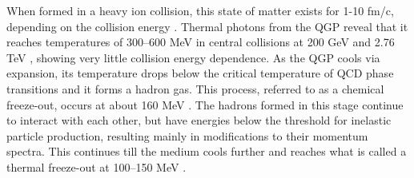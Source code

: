 When formed in a heavy ion collision, this state of matter exists for 1-10 fm/c, depending on the collision energy \cite{doi:10.1146/annurev.nucl.46.1.71}.
Thermal photons from the QGP reveal that it reaches temperatures of 300--600 MeV in central collisions at 200 GeV \cite{PhysRevLett.104.132301} and 2.76 TeV \cite{2016235}, showing very little collision energy dependence.
As the QGP cools via expansion, its temperature drops below the critical temperature of QCD phase transitions and it forms a hadron gas.
This process, referred to as a chemical freeze-out, occurs at about 160 MeV \cite{Fodor_2004, ADAMS2005102, PhysRevC.93.024917}.
The hadrons formed in this stage continue to interact with each other, but have energies below the threshold for inelastic particle production, resulting mainly in modifications to their momentum spectra.
This continues till the medium cools further and reaches what is called a thermal freeze-out at 100--150 MeV \cite{PhysRevC.69.024904, PhysRevC.72.014908, PhysRevC.75.024910, PhysRevC.88.044910}.



